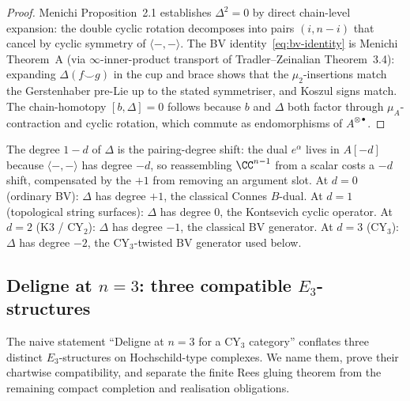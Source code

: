 \begin{proof}
Menichi \cite{MenichiBV} Proposition~2.1 establishes $\Delta^2 = 0$ by direct chain-level expansion: the double cyclic rotation decomposes into pairs $(i, n-i)$ that cancel by cyclic symmetry of $\langle-,-\rangle$. The BV identity~\eqref{eq:bv-identity} is Menichi \cite{MenichiBV} Theorem~A (via $\infty$-inner-product transport of Tradler--Zeinalian \cite{TradlerZeinalian} Theorem~3.4): expanding $\Delta(f \smile g)$ in the cup and brace shows that the $\mu_2$-insertions match the Gerstenhaber pre-Lie up to the stated symmetriser, and Koszul signs match. The chain-homotopy $[b, \Delta] = 0$ follows because $b$ and $\Delta$ both factor through $\mu_A$-contraction and cyclic rotation, which commute as endomorphisms of $A^{\otimes \bullet}$.
\end{proof}

\begin{remark}
\label{rem:delta-degree-shift}
The degree $1 - d$ of $\Delta$ is the pairing-degree shift: the dual $e^\alpha$ lives in $A[-d]$ because $\langle-,-\rangle$ has degree $-d$, so reassembling $\CC^{n-1}$ from a scalar costs a $-d$ shift, compensated by the $+1$ from removing an argument slot. At $d = 0$ (ordinary BV): $\Delta$ has degree $+1$, the classical Connes $B$-dual. At $d = 1$ (topological string surfaces): $\Delta$ has degree $0$, the Kontsevich cyclic operator. At $d = 2$ (K3 / CY$_2$): $\Delta$ has degree $-1$, the classical BV generator. At $d = 3$ (CY$_3$): $\Delta$ has degree $-2$, the CY$_3$-twisted BV generator used below.
\end{remark}

\subsection{Deligne at \texorpdfstring{$n = 3$}{n=3}: three compatible \texorpdfstring{$E_3$}{E-3}-structures}
\label{subsec:deligne-n3-three-structures}

The naive statement ``Deligne at $n = 3$ for a CY$_3$ category'' conflates three distinct $E_3$-structures on Hochschild-type complexes. We name them, prove their chartwise compatibility, and separate the finite Rees gluing theorem from the remaining compact completion and realisation obligations.

